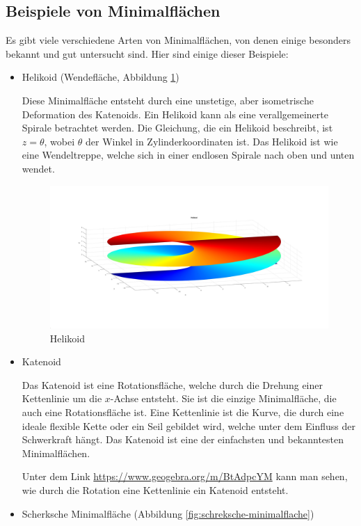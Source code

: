 \subsection{Beispiele von Minimalflächen
	\label{minimalflaechen:subsection:Beispiele von Minimalflächen}}
Es gibt viele verschiedene Arten von Minimalflächen, von denen einige besonders bekannt und gut untersucht sind.
Hier sind einige dieser Beispiele:
\begin{itemize}
	\item
	Helikoid (Wendefläche, Abbildung \ref{fig:helikoid})
%
	
	Diese Minimalfläche entsteht durch eine unstetige, aber isometrische Deformation des Katenoids.
	Ein Helikoid kann als eine verallgemeinerte Spirale betrachtet werden.
	Die Gleichung, die ein Helikoid beschreibt, ist $z=\theta$, wobei $\theta$ der Winkel in Zylinderkoordinaten ist.
	Das Helikoid ist wie eine Wendeltreppe, welche sich in einer endlosen Spirale nach oben und unten wendet.
%
\begin{figure}
	\centering
	\includegraphics[width=\textwidth]{papers/minimalflaechen/Helikoid}
	\caption{Helikoid}
	\label{fig:helikoid}
\end{figure}

	\item
	Katenoid
%
	
	Das Katenoid ist eine Rotationsfläche, welche durch die Drehung einer Kettenlinie um die $x$-Achse entsteht.
	Sie ist die einzige Minimalfläche, die auch eine Rotationsfläche ist.
	Eine Kettenlinie ist die Kurve, die durch eine ideale flexible Kette oder ein Seil gebildet wird, welche unter dem Einfluss der Schwerkraft hängt.
%
	Das Katenoid ist eine der einfachsten und bekanntesten Minimalflächen.
	
	Unter dem Link \url{https://www.geogebra.org/m/BtAdpcYM} kann man sehen, wie durch die Rotation eine Kettenlinie ein Katenoid entsteht.
	\item
	Scherksche Minimalfläche (Abbildung \ref{fig:schreksche-minimalflache})
%
	

\end{itemize}

